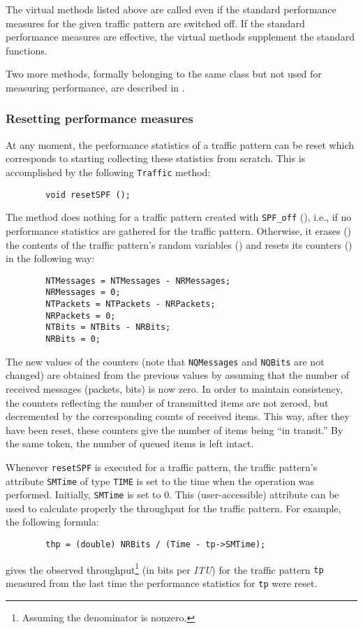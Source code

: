 The virtual methods listed above are called even if the standard performance
measures for the given traffic pattern are switched off.
If the standard performance measures are effective, the virtual methods
supplement the standard functions.

Two more methods, formally belonging to the same class but not used for
measuring performance, are described in .

\subsubsection{Resetting performance measures}
\label{rm_pm_cl_sw}

At any moment, the performance statistics of a traffic pattern can be
reset which
corresponds to starting collecting these statistics from scratch.
This is accomplished by the following {\tt Traffic} method:
\begin{verbatim}
        void resetSPF ();
\end{verbatim}

The method does nothing for a traffic pattern created with {\tt SPF\_off}
(), i.e., if no performance statistics are
gathered for the traffic pattern.
Otherwise, it erases () the contents of the
traffic pattern's random variables () and
resets its counters () in the following way:
\begin{verbatim}
        NTMessages = NTMessages - NRMessages;
        NRMessages = 0;
        NTPackets = NTPackets - NRPackets;
        NRPackets = 0;
        NTBits = NTBits - NRBits;
        NRBits = 0;
\end{verbatim}
The new values of the counters (note that {\tt NQMessages} and {\tt NQBits}
are not changed) are obtained from the previous values by assuming that
the number of received messages (packets, bits) is now zero.
In order to maintain consistency, the counters reflecting the number
of transmitted items are not zeroed, but decremented by the 
corresponding counts of received items.
This way, after they have been reset, these counters give the number
of items being ``in transit.''
By the same token, the number of queued items is left intact.

Whenever {\tt resetSPF} is executed for a traffic pattern, the
traffic pattern's attribute {\tt SMTime} of type {\tt TIME} is set to
the time when the operation was performed.
Initially, {\tt SMTime} is set to 0.
This (user-accessible) attribute can be used to calculate properly
the throughput for the traffic pattern.
For example, the following formula:
\begin{verbatim}
        thp = (double) NRBits / (Time - tp->SMTime);
\end{verbatim}
gives the observed
throughput\footnote{Assuming the denominator is nonzero.}
(in bits per {\em ITU\/})
for the traffic pattern {\tt tp} measured
from the last time the performance statistics for {\tt tp} were
reset.

